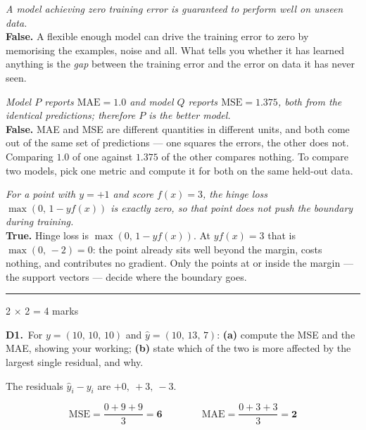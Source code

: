 \documentclass[10pt,a4paper]{article}
\newcommand{\parthead}[2]{\vspace{2pt}\noindent\rule{\linewidth}{0.4pt}\par\vspace{2pt}%
  \noindent{\bfseries Part #1}\hfill{\small #2}\par\vspace{1pt}}
\newcommand{\sol}[1]{\textbf{#1}}
\begin{document}
\begin{sC}

  \item \emph{A model achieving zero training error is guaranteed to perform well on unseen data.}\\[2pt] \textbf{False.} A flexible enough model can drive the training error to zero by memorising the examples, noise and all. What tells you whether it has learned anything is the \emph{gap} between the training error and the error on data it has never seen.

  \item \emph{Model $P$ reports $\mathrm{MAE} = 1.0$ and model $Q$ reports $\mathrm{MSE} = 1.375$, both from the identical predictions; therefore $P$ is the better model.}\\[2pt] \textbf{False.} MAE and MSE are different quantities in different units, and both come out of the same set of predictions --- one squares the errors, the other does not. Comparing $1.0$ of one against $1.375$ of the other compares nothing. To compare two models, pick one metric and compute it for both on the same held-out data.

  \item \emph{For a point with $y = +1$ and score $f(x) = 3$, the hinge loss $\max(0,\,1 - y f(x))$ is exactly zero, so that point does not push the boundary during training.}\\[2pt] \textbf{True.} Hinge loss is $\max(0,\,1 - y f(x))$. At $y f(x) = 3$ that is $\max(0,\,-2) = 0$: the point already sits well beyond the margin, costs nothing, and contributes no gradient. Only the points at or inside the margin --- the support vectors --- decide where the boundary goes.

\end{sC}

\newpage

\parthead{D --- Short answer}{2 $\times$ 2 = 4 marks}

\textbf{D1.}\ For $y = (10,\,10,\,10)$ and $\hat{y} = (10,\,13,\,7)$: \textbf{(a)} compute the MSE and the MAE, showing your working; \textbf{(b)} state which of the two is more affected by the largest single residual, and why.

\vspace{2pt}

The residuals $\hat y_i - y_i$ are $+0,\ +3,\ -3$.

\[ \mathrm{MSE} = \frac{0 + 9 + 9}{3} = \sol{6} \qquad\qquad \mathrm{MAE} = \frac{0 + 3 + 3}{3} = \sol{2} \]
\end{document}
